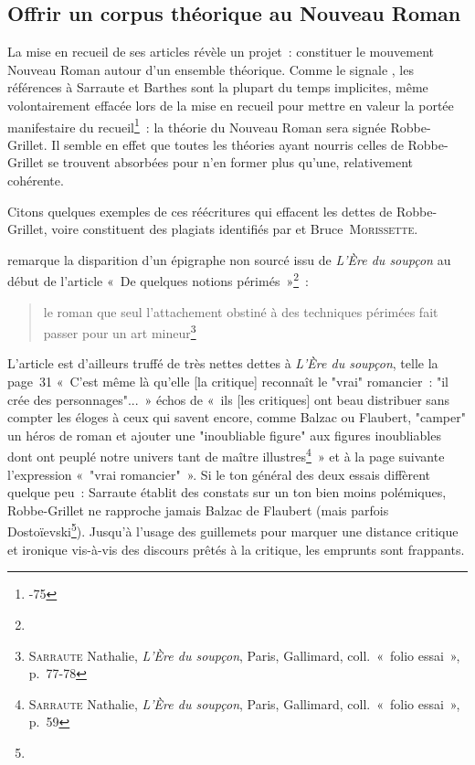 \documentclass[12pt, a4paper]{article}
\begin{document}
    


\subsection{Offrir un corpus théorique au Nouveau Roman}

La mise en recueil de ses articles révèle un projet~: constituer le mouvement Nouveau Roman autour d'un ensemble théorique. Comme le signale \galia, les références à Sarraute et Barthes sont la plupart du temps implicites, même volontairement effacée lors de la mise en recueil pour mettre en valeur la portée manifestaire du recueil\footnote{-75}~: la théorie du Nouveau Roman sera signée Robbe-Grillet. Il semble en effet que toutes les théories ayant nourris celles de Robbe-Grillet se trouvent absorbées pour n'en former plus qu'une, relativement cohérente.

Citons quelques exemples de ces réécritures qui effacent les dettes de Robbe-Grillet, voire constituent des plagiats identifiés par \galia{} et Bruce~\textsc{Morissette}.



\galia{} remarque la disparition d'un épigraphe non sourcé issu de \textit{L'Ère du soupçon} au début de l'article «~De quelques notions périmés~»\footnote{}~:
\begin{quote}
    le roman que seul l'attachement obstiné à des techniques périmées fait passer pour un art mineur\footnote{\textsc{Sarraute} Nathalie, \textit{L'Ère du soupçon}, Paris, Gallimard, coll.~«~folio essai~», p.~77-78}
\end{quote}

L'article est d'ailleurs truffé de très nettes dettes à \textit{L'Ère du soupçon}, telle la page~31 «~C’est même là qu’elle [la critique] reconnaît le "vrai" romancier~: "il crée des personnages"...~» échos de «~ils [les critiques] ont beau distribuer sans compter les éloges à ceux qui savent encore, comme Balzac ou Flaubert, "camper" un héros de roman et ajouter une "inoubliable figure" aux figures inoubliables dont ont peuplé notre univers tant de maître illustres\footnote{\textsc{Sarraute} Nathalie, \textit{L'Ère du soupçon}, Paris, Gallimard, coll.~«~folio essai~», p.~59}~» et à la page suivante l'expression «~"vrai romancier"~». Si le ton général des deux essais diffèrent quelque peu~: Sarraute établit des constats sur un ton bien moins polémiques, Robbe-Grillet ne rapproche jamais Balzac de Flaubert (mais parfois Dostoïevski\footnote{}). Jusqu'à l'usage des guillemets pour marquer une distance critique et ironique vis-à-vis des discours prêtés à la critique, les emprunts sont frappants. 
\end{document}

